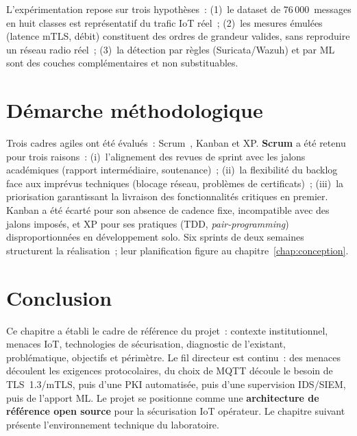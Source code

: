 L'expérimentation repose sur trois hypothèses~: (1)~le dataset de 76\,000~messages en huit classes est représentatif du trafic IoT réel~; (2)~les mesures émulées (latence mTLS, débit) constituent des ordres de grandeur valides, sans reproduire un réseau radio réel~; (3)~la détection par règles (Suricata/Wazuh) et par ML sont des couches complémentaires et non substituables.

\section{Démarche méthodologique}
\label{sec:methodo}

Trois cadres agiles ont été évalués~: Scrum~\cite{scrum_guide}, Kanban et XP. \textbf{Scrum} a été retenu pour trois raisons~: (i)~l'alignement des revues de sprint avec les jalons académiques (rapport intermédiaire, soutenance)~; (ii)~la flexibilité du backlog face aux imprévus techniques (blocage réseau, problèmes de certificats)~; (iii)~la priorisation garantissant la livraison des fonctionnalités critiques en premier. Kanban a été écarté pour son absence de cadence fixe, incompatible avec des jalons imposés, et XP pour ses pratiques (TDD, \emph{pair-programming}) disproportionnées en développement solo. Six sprints de deux semaines structurent la réalisation~; leur planification figure au chapitre~\ref{chap:conception}.

\section{Conclusion}
\label{sec:contexte-conclusion}
\label{sec:ea-conclusion}
\label{sec:ea-positionnement}

Ce chapitre a établi le cadre de référence du projet~: contexte institutionnel, menaces IoT, technologies de sécurisation, diagnostic de l'existant, problématique, objectifs et périmètre. Le fil directeur est continu~: des menaces découlent les exigences protocolaires, du choix de MQTT découle le besoin de TLS~1.3/mTLS, puis d'une PKI automatisée, puis d'une supervision IDS/SIEM, puis de l'apport ML. Le projet se positionne comme une \textbf{architecture de référence open source} pour la sécurisation IoT opérateur. Le chapitre suivant présente l'environnement technique du laboratoire.
